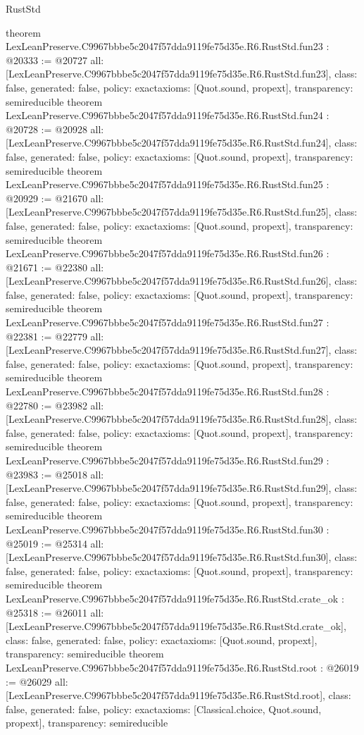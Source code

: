 \begin{lexlean}{RustStd}
\begin{coremodule}
{}
theorem LexLeanPreserve.C9967bbbe5c2047f57dda9119fe75d35e.R6.RustStd.fun23 : @20333 := @20727 {
  all: [LexLeanPreserve.C9967bbbe5c2047f57dda9119fe75d35e.R6.RustStd.fun23],
  class: false,
  generated: false,
  policy: exact{axioms: [Quot.sound, propext]},
  transparency: semireducible
}
theorem LexLeanPreserve.C9967bbbe5c2047f57dda9119fe75d35e.R6.RustStd.fun24 : @20728 := @20928 {
  all: [LexLeanPreserve.C9967bbbe5c2047f57dda9119fe75d35e.R6.RustStd.fun24],
  class: false,
  generated: false,
  policy: exact{axioms: [Quot.sound, propext]},
  transparency: semireducible
}
theorem LexLeanPreserve.C9967bbbe5c2047f57dda9119fe75d35e.R6.RustStd.fun25 : @20929 := @21670 {
  all: [LexLeanPreserve.C9967bbbe5c2047f57dda9119fe75d35e.R6.RustStd.fun25],
  class: false,
  generated: false,
  policy: exact{axioms: [Quot.sound, propext]},
  transparency: semireducible
}
theorem LexLeanPreserve.C9967bbbe5c2047f57dda9119fe75d35e.R6.RustStd.fun26 : @21671 := @22380 {
  all: [LexLeanPreserve.C9967bbbe5c2047f57dda9119fe75d35e.R6.RustStd.fun26],
  class: false,
  generated: false,
  policy: exact{axioms: [Quot.sound, propext]},
  transparency: semireducible
}
theorem LexLeanPreserve.C9967bbbe5c2047f57dda9119fe75d35e.R6.RustStd.fun27 : @22381 := @22779 {
  all: [LexLeanPreserve.C9967bbbe5c2047f57dda9119fe75d35e.R6.RustStd.fun27],
  class: false,
  generated: false,
  policy: exact{axioms: [Quot.sound, propext]},
  transparency: semireducible
}
theorem LexLeanPreserve.C9967bbbe5c2047f57dda9119fe75d35e.R6.RustStd.fun28 : @22780 := @23982 {
  all: [LexLeanPreserve.C9967bbbe5c2047f57dda9119fe75d35e.R6.RustStd.fun28],
  class: false,
  generated: false,
  policy: exact{axioms: [Quot.sound, propext]},
  transparency: semireducible
}
theorem LexLeanPreserve.C9967bbbe5c2047f57dda9119fe75d35e.R6.RustStd.fun29 : @23983 := @25018 {
  all: [LexLeanPreserve.C9967bbbe5c2047f57dda9119fe75d35e.R6.RustStd.fun29],
  class: false,
  generated: false,
  policy: exact{axioms: [Quot.sound, propext]},
  transparency: semireducible
}
theorem LexLeanPreserve.C9967bbbe5c2047f57dda9119fe75d35e.R6.RustStd.fun30 : @25019 := @25314 {
  all: [LexLeanPreserve.C9967bbbe5c2047f57dda9119fe75d35e.R6.RustStd.fun30],
  class: false,
  generated: false,
  policy: exact{axioms: [Quot.sound, propext]},
  transparency: semireducible
}
theorem LexLeanPreserve.C9967bbbe5c2047f57dda9119fe75d35e.R6.RustStd.crate_ok : @25318 := @26011 {
  all: [LexLeanPreserve.C9967bbbe5c2047f57dda9119fe75d35e.R6.RustStd.crate_ok],
  class: false,
  generated: false,
  policy: exact{axioms: [Quot.sound, propext]},
  transparency: semireducible
}
theorem LexLeanPreserve.C9967bbbe5c2047f57dda9119fe75d35e.R6.RustStd.root : @26019 := @26029 {
  all: [LexLeanPreserve.C9967bbbe5c2047f57dda9119fe75d35e.R6.RustStd.root],
  class: false,
  generated: false,
  policy: exact{axioms: [Classical.choice, Quot.sound, propext]},
  transparency: semireducible
}


\end{coremodule}
\end{lexlean}
